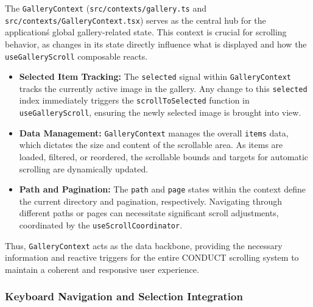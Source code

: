\documentclass[10pt]{article}
\begin{document}
The \texttt{GalleryContext} (\texttt{src/contexts/gallery.ts} and \texttt{src/contexts/GalleryContext.tsx}) serves as the central hub for the application\'s global gallery-related state. This context is crucial for scrolling behavior, as changes in its state directly influence what is displayed and how the \texttt{useGalleryScroll} composable reacts.
\begin{itemize}
    \item \textbf{Selected Item Tracking:} The \texttt{selected} signal within \texttt{GalleryContext} tracks the currently active image in the gallery. Any change to this \texttt{selected} index immediately triggers the \texttt{scrollToSelected} function in \texttt{useGalleryScroll}, ensuring the newly selected image is brought into view.
    \item \textbf{Data Management:} \texttt{GalleryContext} manages the overall \texttt{items} data, which dictates the size and content of the scrollable area. As items are loaded, filtered, or reordered, the scrollable bounds and targets for automatic scrolling are dynamically updated.
    \item \textbf{Path and Pagination:} The \texttt{path} and \texttt{page} states within the context define the current directory and pagination, respectively. Navigating through different paths or pages can necessitate significant scroll adjustments, coordinated by the \texttt{useScrollCoordinator}.
\end{itemize}
Thus, \texttt{GalleryContext} acts as the data backbone, providing the necessary information and reactive triggers for the entire CONDUCT scrolling system to maintain a coherent and responsive user experience.

\subsubsection{Keyboard Navigation and Selection Integration}
\end{document}
